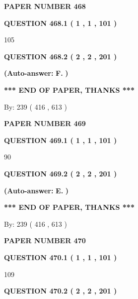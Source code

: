 \documentclass[12pt]{article}
\begin{document}
   
\newpage 
\setcounter{page}{ 
   468001 } 
   
   
 {\textbf{ \Large{ PAPER NUMBER  468  }}}
   
   
   
   
  
  
{\textbf{\large{QUESTION
468.1 
 ( 1 , 1 , 101 )
}}}

105
  
  
{\textbf{\large{QUESTION
468.2 
 ( 2 , 2 , 201 )
}}}
 
 
{\textbf{(Auto-answer:}}
{\textbf{\large{
F.}}}
{\textbf{)}}
 
 
   
   
   
   
\vspace{1.0in} 
{\textbf{\large{ *** END OF PAPER, THANKS *** }}} 
   
   
\hspace{1.0in} By: 
 239 ( 416 ,  613 )
   
   
   
   
\newpage 
\setcounter{page}{ 
   469001 } 
   
   
 {\textbf{ \Large{ PAPER NUMBER  469  }}}
   
   
   
   
  
  
{\textbf{\large{QUESTION
469.1 
 ( 1 , 1 , 101 )
}}}

90
  
  
{\textbf{\large{QUESTION
469.2 
 ( 2 , 2 , 201 )
}}}
 
 
{\textbf{(Auto-answer:}}
{\textbf{\large{
E.}}}
{\textbf{)}}
 
 
   
   
   
   
\vspace{1.0in} 
{\textbf{\large{ *** END OF PAPER, THANKS *** }}} 
   
   
\hspace{1.0in} By: 
 239 ( 416 ,  613 )
   
   
   
   
\newpage 
\setcounter{page}{ 
   470001 } 
   
   
 {\textbf{ \Large{ PAPER NUMBER  470  }}}
   
   
   
   
  
  
{\textbf{\large{QUESTION
470.1 
 ( 1 , 1 , 101 )
}}}

109
  
  
{\textbf{\large{QUESTION
470.2 
 ( 2 , 2 , 201 )
}}}
 
\end{document}
